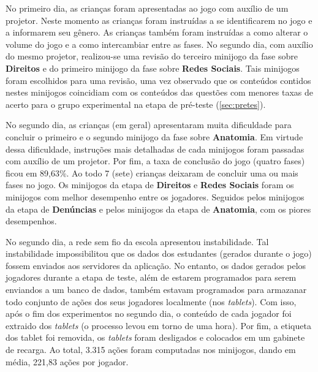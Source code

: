No primeiro dia, as crianças foram apresentadas ao jogo com auxílio de um projetor. Neste momento as crianças foram instruídas a se identificarem no jogo e a informarem seu gênero. As crianças também foram instruídas a como alterar o volume do jogo e a como intercambiar entre as fases. No segundo dia, com auxílio do mesmo projetor, realizou-se uma revisão do terceiro minijogo da fase sobre \textbf{Direitos} e do primeiro minijogo da fase sobre \textbf{Redes Sociais}. Tais minijogos foram escolhidos para uma revisão, uma vez observado que os conteúdos contidos nestes minijogos coincidiam com os conteúdos das questões com menores taxas de acerto para o grupo experimental na etapa de pré-teste (\autoref{sec:pretes}).

No segundo dia, as crianças (em geral) apresentaram muita dificuldade para concluir o primeiro e o segundo minijogo da fase sobre \textbf{Anatomia}. Em virtude dessa dificuldade, instruções mais detalhadas de cada minijogos foram passadas com auxílio de um projetor. Por fim, a taxa de conclusão do jogo (quatro fases) ficou em 89,63\%. Ao todo 7 (sete) crianças deixaram de concluir uma ou mais fases no jogo. Os minijogos da etapa de \textbf{Direitos} e \textbf{Redes Sociais} foram os minijogos com melhor desempenho entre os jogadores. Seguidos pelos minijogos da etapa de \textbf{Denúncias} e pelos minijogos da etapa de \textbf{Anatomia}, com os piores desempenhos. 

No segundo dia, a rede sem fio da escola apresentou instabilidade. Tal instabilidade impossibilitou que os dados dos estudantes (gerados durante o jogo) fossem enviados aos servidores da aplicação. No entanto, os dados gerados pelos jogadores durante a etapa de teste, além de estarem programados para serem enviandos a um banco de dados, também estavam programados para armazanar todo conjunto de ações dos seus jogadores localmente (nos \textit{tablets}). Com isso, após o fim dos experimentos no segundo dia, o conteúdo de cada jogador foi extraido dos \textit{tablets} (o processo levou em torno de uma hora). Por fim, a etiqueta dos tablet foi removida, os \textit{tablets} foram desligados e colocados em um gabinete de recarga. Ao total, 3.315 ações foram computadas nos minijogos, dando em média, 221,83 ações por jogador.

